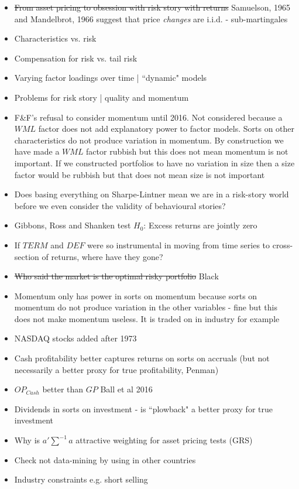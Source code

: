 \begin{itemize}
  \item \sout{From asset pricing to obsession with risk story with returns}
  Samuelson, 1965 and Mandelbrot, 1966 suggest that price \emph{changes} are i.i.d. -
  sub-martingales
  \item Characteristics vs. risk
  \item Compensation for risk vs. tail risk
  \item Varying factor loadings over time | ``dynamic" models
  \item Problems for risk story | quality and momentum
  \item F\&F's refusal to consider momentum until 2016. Not considered because a $WML$ 
  factor does not add explanatory power to factor models. Sorts on other characteristics
  do not produce variation in momentum. By construction we have made a $WML$ factor
  rubbish but this does not mean momentum is not important. If we constructed portfolios
  to have no variation in size then a size factor would be rubbish but that does not mean
  size is not important
  \item Does basing everything on Sharpe-Lintner mean we are in a risk-story world before
  we even consider the validity of behavioural stories?
  \item Gibbons, Ross and Shanken test $H_0$: Excess returns are jointly zero
  \item If $TERM$ and $DEF$ were so instrumental in moving from time series to
  cross-section of returns, where have they gone?
  \item \sout{Who said the market is the optimal risky portfolio} Black
  \item Momentum only has power in sorts on momentum because sorts on momentum do not
  produce variation in the other variables - fine but this does not make momentum useless.
  It is traded on in industry for example
  \item NASDAQ stocks added after 1973
  \item Cash profitability better captures returns on sorts on accruals (but not
  necessarily a better proxy for true profitability, Penman)
  \item $OP_{Cash}$ better than $GP$ Ball et al 2016
  \item Dividends in sorts on investment - is ``plowback" a better proxy for true
  investment
  \item Why is $a'\sum^{-1}a$ attractive weighting for asset pricing tests (GRS)
  \item Check not data-mining by using in other countries
  \item Industry constraints e.g. short selling

\end{itemize}
